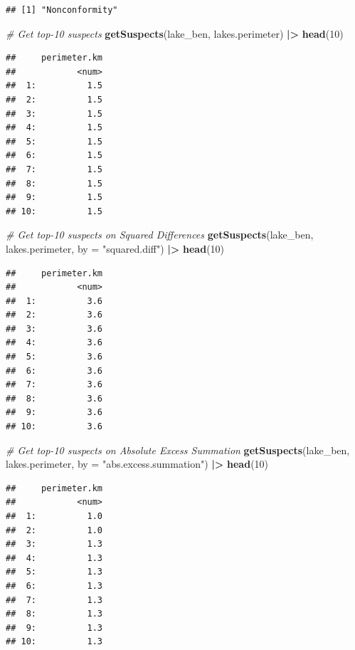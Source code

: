 \documentclass[
]{book}
\newenvironment{Shaded}{\begin{snugshade}}{\end{snugshade}}
\newcommand{\AttributeTok}[1]{\textcolor[rgb]{0.13,0.29,0.53}{#1}}
\newcommand{\CommentTok}[1]{\textcolor[rgb]{0.56,0.35,0.01}{\textit{#1}}}
\newcommand{\DecValTok}[1]{\textcolor[rgb]{0.00,0.00,0.81}{#1}}
\newcommand{\FunctionTok}[1]{\textcolor[rgb]{0.13,0.29,0.53}{\textbf{#1}}}
\newcommand{\NormalTok}[1]{#1}
\newcommand{\SpecialCharTok}[1]{\textcolor[rgb]{0.81,0.36,0.00}{\textbf{#1}}}
\newcommand{\StringTok}[1]{\textcolor[rgb]{0.31,0.60,0.02}{#1}}
\begin{document}
\begin{verbatim}
## [1] "Nonconformity"
\end{verbatim}

\begin{Shaded}
\begin{Highlighting}[]
\CommentTok{\# Get top{-}10 suspects}
\FunctionTok{getSuspects}\NormalTok{(lake\_ben, lakes.perimeter) }\SpecialCharTok{|\textgreater{}}
  \FunctionTok{head}\NormalTok{(}\DecValTok{10}\NormalTok{)}
\end{Highlighting}
\end{Shaded}

\begin{verbatim}
##     perimeter.km
##            <num>
##  1:          1.5
##  2:          1.5
##  3:          1.5
##  4:          1.5
##  5:          1.5
##  6:          1.5
##  7:          1.5
##  8:          1.5
##  9:          1.5
## 10:          1.5
\end{verbatim}

\begin{Shaded}
\begin{Highlighting}[]
\CommentTok{\# Get top{-}10 suspects on Squared Differences}
\FunctionTok{getSuspects}\NormalTok{(lake\_ben, lakes.perimeter, }
            \AttributeTok{by =} \StringTok{"squared.diff"}\NormalTok{) }\SpecialCharTok{|\textgreater{}}
  \FunctionTok{head}\NormalTok{(}\DecValTok{10}\NormalTok{)}
\end{Highlighting}
\end{Shaded}

\begin{verbatim}
##     perimeter.km
##            <num>
##  1:          3.6
##  2:          3.6
##  3:          3.6
##  4:          3.6
##  5:          3.6
##  6:          3.6
##  7:          3.6
##  8:          3.6
##  9:          3.6
## 10:          3.6
\end{verbatim}

\begin{Shaded}
\begin{Highlighting}[]
\CommentTok{\# Get top{-}10 suspects on Absolute Excess Summation}
\FunctionTok{getSuspects}\NormalTok{(lake\_ben, lakes.perimeter, }
            \AttributeTok{by =} \StringTok{"abs.excess.summation"}\NormalTok{) }\SpecialCharTok{|\textgreater{}}
  \FunctionTok{head}\NormalTok{(}\DecValTok{10}\NormalTok{)}
\end{Highlighting}
\end{Shaded}

\begin{verbatim}
##     perimeter.km
##            <num>
##  1:          1.0
##  2:          1.0
##  3:          1.3
##  4:          1.3
##  5:          1.3
##  6:          1.3
##  7:          1.3
##  8:          1.3
##  9:          1.3
## 10:          1.3
\end{verbatim}
\end{document}
